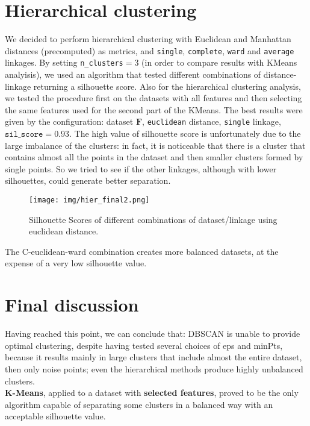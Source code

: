 \section{Hierarchical clustering}
We decided to perform hierarchical clustering with Euclidean and Manhattan distances (precomputed) as metrics, and \texttt{single}, \texttt{complete}, \texttt{ward} and \texttt{average} linkages. By setting \texttt{n\_clusters}$=3$ (in order to compare results with KMeans analyisis), we used an algorithm that tested different combinations of distance-linkage returning a silhouette score. Also for the hierarchical clustering analysis, we tested the procedure first on the datasets with all features and then selecting the same features used for the second part of the KMeans. The best results were given by the configuration: dataset $\mathbf{F}$, \texttt{euclidean} distance, \texttt{single} linkage, $\texttt{sil\_score}=0.93$. The high value of silhouette score is unfortunately due to the large imbalance of the clusters: in fact, it is noticeable that there is a cluster that contains almost all the points in the dataset and then smaller clusters formed by single points. So we tried to see if the other linkages, although with lower silhouettes, could generate better separation.
\begin{figure}[H]
    \centering
    \texttt{[image: img/hier\_final2.png]}
    \caption{Silhouette Scores of different combinations of dataset/linkage using euclidean distance.}
    \label{fig:enter-label}
\end{figure}
\noindent The C-euclidean-ward combination creates more balanced datasets, at the expense of a very low silhouette value.
\section{Final discussion}
Having reached this point, we can conclude that: DBSCAN is unable to provide optimal clustering, despite having tested several choices of eps and minPts, because it results mainly in large clusters that include almost the entire dataset, then only noise points; even the hierarchical methods produce highly unbalanced clusters. \\
\textbf{K-Means}, applied to a dataset with \textbf{selected features}, proved to be the only algorithm capable of separating some clusters in a balanced way with an acceptable silhouette value.